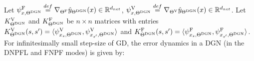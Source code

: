 \begin{proposition}\label{prop:dgn} Let $\psi^{\text{F}}_{x,\Theta^{\text{DGN}}}\stackrel{def}=\nabla_{{\Theta}^{\text{F}}}\hat{y}_{\Theta^{\text{DGN}}}(x) \in \mathbb{R}^{d_{net}}$, $\psi^{\text{V}}_{x,\Theta^{\text{DGN}}}\stackrel{def}=\nabla_{{\Theta}^{\text{V}}}\hat{y}_{\Theta^{\text{DGN}}}(x) \in \mathbb{R}^{d_{net}}$. Let $K^{\text{V}}_{\Theta^{\text{DGN}}}$ and $K^{\text{F}}_{\Theta^{\text{DGN}}}$ be $n\times n$ matrices with entries $K^{\text{V}}_{\Theta^{\text{DGN}}}(s,s')=\langle \psi^{\text{V}}_{x_s,\Theta^{\text{DGN}}},\psi^{\text{V}}_{x_{s'},\Theta^{\text{DGN}}}\rangle$ and $K^{\text{F}}_{\Theta^{\text{DGN}}}(s,s')=\langle \psi^{\text{F}}_{x_s,\Theta^{\text{DGN}}},\psi^{\text{F}}_{x_{s'},\Theta^{\text{DGN}}}\rangle$. For infinitesimally small step-size of GD, the error dynamics in a DGN (in the DNPFL  and FNPF modes) is given by:
\FloatBarrier
\begin{table}[h]
\end{table}
\end{proposition}
